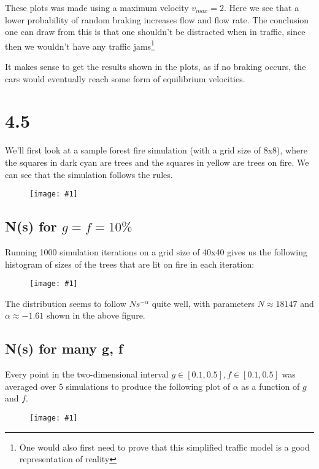 \documentclass[11pt]{article}
\newcommand{\singlewiderfigure}[1]{
\begin{figure}[H]
  \centering
  \begin{minipage}{0.6\textwidth}
    \centering
    \texttt{[image: \#1]}
  \end{minipage}
\end{figure}
}
\begin{document}
These plots was made using a maximum velocity $v_{max} = 2$. Here we see that a lower probability of random braking increases flow and flow rate.
The conclusion one can draw from this is that one shouldn't be distracted when in traffic, since then we wouldn't have any traffic jams\footnote{One would also first need to prove that this simplified traffic model is a good representation of reality}

It makes sense to get the results shown in the plots, as if no braking occurs, the cars would eventually reach some form of equilibrium velocities.

\pagebreak

\section*{4.5}
We'll first look at a sample forest fire simulation (with a grid size of 8x8), where the squares in dark cyan are trees and the squares in yellow are trees on fire. 
We can see that the simulation follows the rules.
\singlewiderfigure{./plots/4_5/sample.png}

\subsection*{N(s) for $g = f = 10\%$}
Running 1000 simulation iterations on a grid size of 40x40 gives us the following histogram of sizes of the trees that are lit on fire in each iteration:
\singlewiderfigure{./plots/4_5/histogram.png}
The distribution seems to follow $N s^{-\alpha}$ quite well, with parameters $N \approx 18147$ and $\alpha \approx -1.61$ shown in the above figure.

\subsection*{N(s) for many g, f}
Every point in the two-dimensional interval $g \in [0.1, 0.5], f \in [0.1, 0.5]$ was averaged over 5 simulations to produce the following plot of $\alpha$ as a function of $g$ and $f$.
\singlewiderfigure{./plots/4_5/parameters.png}
\end{document}

